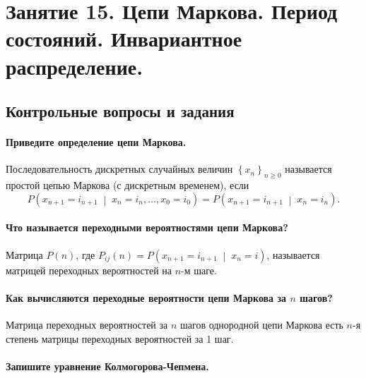 \chapter*{Занятие 15. Цепи Маркова. Период состояний. Инвариантное распределение.}

\section*{Контрольные вопросы и задания}

\subsubsection*{Приведите определение цепи Маркова.}

Последовательность дискретных случайных величин $ \left\{ x_n \right\}_{n \geq 0}$
называется простой цепью Маркова (с дискретным временем), если
\begin{equation*}
  P \left( x_{n + 1} = i_{n + 1} \; \middle| \; x_n = i_n, \dotsc, x_0 = i_0 \right) =
  P \left( x_{n + 1} = i_{n + 1} \; \middle| \; x_n = i_n \right).
\end{equation*}

\subsubsection*{Что называется переходными вероятностями цепи Маркова?}

Матрица $P \left( n \right) $,
где $P_{ij} \left( n \right) = P \left( x_{n + 1} = i_{n + 1} \; \middle| \; x_n = i \right) $,
называется матрицей переходных вероятностей на $n$-м шаге.

\subsubsection*{Как вычисляются переходные вероятности цепи Маркова за $n$ шагов?}

Матрица переходных вероятностей за $n$ шагов однородной цепи Маркова есть $n$-я
степень матрицы переходных вероятностей за 1 шаг.

\subsubsection*{Запишите уравнение Колмогорова-Чепмена.}

